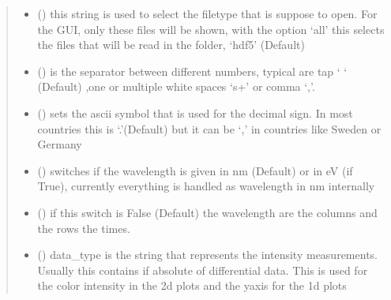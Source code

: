 \documentclass[letterpaper,10pt,english]{sphinxmanual}
\begin{document}
\begin{fulllineitems}
\begin{quote}
\begin{description}
\begin{itemize}
\item {} 
 (\sphinxstyleliteralemphasis{\sphinxupquote{, }}) \textendash{} this string is used to select the filetype that is suppose to open. For the GUI, only these files will be shown,
with the option ‘all’ this selects the files that will be read in the folder, ‘hdf5’ (Default)

\item {} 
 (\sphinxstyleliteralemphasis{\sphinxupquote{ (}}\sphinxstyleliteralemphasis{\sphinxupquote{)}}) \textendash{} is the separator between different numbers, typical are tap ‘   ‘ (Default) ,one or
multiple white spaces ‘s+’ or comma ‘,’.

\item {} 
 (\sphinxstyleliteralemphasis{\sphinxupquote{ (}}\sphinxstyleliteralemphasis{\sphinxupquote{)}}) \textendash{} sets the ascii symbol that is used for the decimal sign. In most countries this is ‘.’(Default)
but it can be ‘,’ in countries like Sweden or Germany

\item {} 
 (\sphinxstyleliteralemphasis{\sphinxupquote{ (}}\sphinxstyleliteralemphasis{\sphinxupquote{)}}) \textendash{} switches if the wavelength is given in nm (Default) or in eV (if True), currently everything
is handled as wavelength in nm internally

\item {} 
 (\sphinxstyleliteralemphasis{\sphinxupquote{ (}}\sphinxstyleliteralemphasis{\sphinxupquote{)}}) \textendash{} if this switch is False (Default) the wavelength are the columns and the rows the times.

\item {} 
 (\sphinxstyleliteralemphasis{\sphinxupquote{ (}}\sphinxstyleliteralemphasis{\sphinxupquote{)}}) \textendash{} data\_type is the string that represents the intensity measurements. Usually this contains if absolute
of differential data. This is used for the color intensity in the 2d plots and the y\sphinxhyphen{}axis for the 1d plots


\end{itemize}
\end{description}
\end{quote}
\end{fulllineitems}
\end{document}
